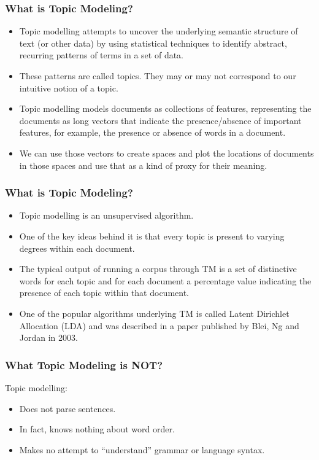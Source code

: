 \begin{frame}[fragile]\frametitle{What is Topic Modeling?}
  \begin{itemize}
  	\item Topic modelling attempts to uncover the underlying semantic structure of text (or other data) by using statistical techniques to identify abstract, recurring patterns of terms in a set of data. 
  	\item These patterns are called topics. They may or may not correspond to our intuitive notion of a topic. 
	\item Topic modelling models documents as collections of features, representing the documents as long vectors that indicate the presence/absence of important features, for example, the presence or absence of words in a document. 
	\item We can use those vectors to create spaces and plot the locations of documents in those spaces and use that as a kind of proxy for their meaning.
  \end{itemize}
\end{frame}

\begin{frame}[fragile]\frametitle{What is Topic Modeling?}
  \begin{itemize}
  	\item Topic modelling is an unsupervised algorithm.
  	\item One of the key ideas behind it is that every topic is present to
varying degrees within each document. 
\item The typical output of running a corpus
through TM is a set of distinctive words for each topic and for each document
a percentage value indicating the presence of each topic within that document.
  	\item One of the popular algorithms underlying TM is called Latent Dirichlet Allocation (LDA) and
was described in a paper published by Blei, Ng and Jordan in 2003. 
  \end{itemize}
\end{frame}

\begin{frame}[fragile]\frametitle{What Topic Modeling is NOT?}
Topic modelling: 
  \begin{itemize}
  	\item Does not parse sentences. 
  	\item In fact, knows nothing about word order. 
  	\item Makes no attempt to ``understand'' grammar or language syntax. 
  \end{itemize}
\end{frame}

